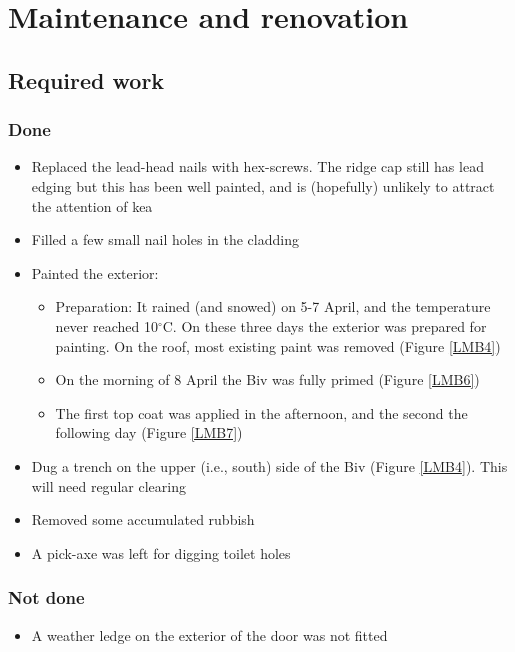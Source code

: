 \documentclass[12pt]{article} %
\begin{document}
\section{Maintenance and renovation}

\subsection{Required work}

\subsubsection{Done}

\begin{itemize}
 \item Replaced the lead-head nails with hex-screws.  The ridge cap still has lead edging but this has been well painted, and is (hopefully) unlikely to attract the attention of kea
 \item Filled a few small nail holes in the cladding
 \item Painted the exterior:
 \begin{itemize}
  \item Preparation: It rained (and snowed) on 5-7 April, and the temperature never reached 10$^{\circ}$C.  On these three days the exterior was prepared for painting.  On the roof, most existing paint was removed (Figure \ref{LMB4})
  \item On the morning of 8 April the Biv was fully primed (Figure \ref{LMB6})
  \item The first top coat was applied in the afternoon, and the second the following day (Figure \ref{LMB7})
 \end{itemize}
 \item Dug a trench on the upper (i.e., south) side of the Biv (Figure \ref{LMB4}).  This will need regular clearing
 \item Removed some accumulated rubbish
 \item A pick-axe was left for digging toilet holes
\end{itemize}

\subsubsection{Not done}
\begin{itemize}
 \item A weather ledge on the exterior of the door was not fitted
\end{itemize}
\end{document}
